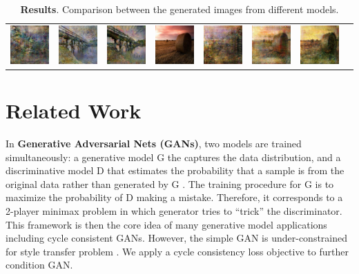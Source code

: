 \documentclass[10pt,twocolumn,letterpaper]{article}
\begin{document}
\begin{table}
\begin{tabular}{c c c c | c c c c}
		\includegraphics[width=5em]{2605_leo.jpg} & 
		\includegraphics[width=5em]{2605_gen.jpg} &
		\includegraphics[width=5em]{2605_unet.jpg} &
		\includegraphics[width=5em]{6476_real.jpg}& 
		\includegraphics[width=5em]{6476_leo.jpg} & 
		\includegraphics[width=5em]{6476_gen.jpg} &
		\includegraphics[width=5em]{6476_unet.jpg} \\
	\end{tabular}
	\caption{\textbf{Results}. Comparison between the generated images from different models.}
	\label{table:results}
\end{table}


\section{Related Work}
In \textbf{Generative Adversarial Nets (GANs)}, two models are trained simultaneously: a generative model G the captures the data distribution, and a discriminative model D that estimates the probability that a sample is from the original data rather than generated by G \cite{simplegan}. The training procedure for G is to maximize the probability of D making a mistake. Therefore, it corresponds to a 2-player minimax problem in which generator tries to “trick” the discriminator. This framework is then the core idea of many generative model applications including cycle consistent GANs. However, the simple GAN is under-constrained for style transfer problem \cite{cyclegan}. We apply a cycle consistency loss objective to further condition GAN.  
\end{document}
